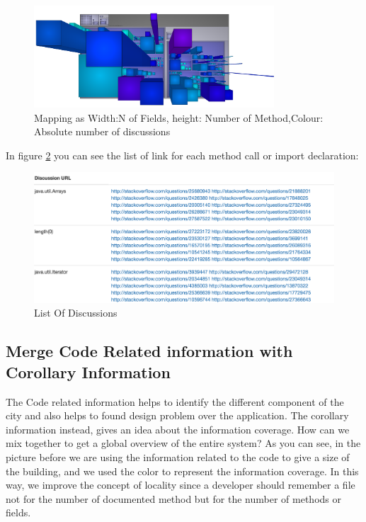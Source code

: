 \documentclass[]{usiinfbachelorproject}
\begin{document}
\begin{figure}[H]
	\centering
	\includegraphics[width=0.8\textwidth]{images/discAbsLang}
	
	\caption[Discussion Mapping]{Mapping as Width:N of Fields, height: Number of Method,Colour: Absolute number of discussions\label{fig:disc}}

\end{figure}

In figure \ref{fig:list} you can see the list of link for each method call or import declaration:


 \begin{figure}[H]
	\centering
	\includegraphics[width=1\textwidth]{images/listOfDiscussions}
		\caption[List Of Discussions]{List Of Discussions \label{fig:list}
}

\end{figure}


\subsection{Merge Code Related information with Corollary Information}
The Code related information helps to identify the different component of the city and also helps to found design problem over the application. The corollary information instead, gives an idea about the information coverage. How can we mix together to get a global overview of the entire system? As you can see, in the picture before we are using the information related to the code to give a size of the building, and we used the color to represent the information coverage. In this way, we improve the concept of locality since a developer should remember a file not for the number of documented method but for the number of methods or fields.
\end{document}
